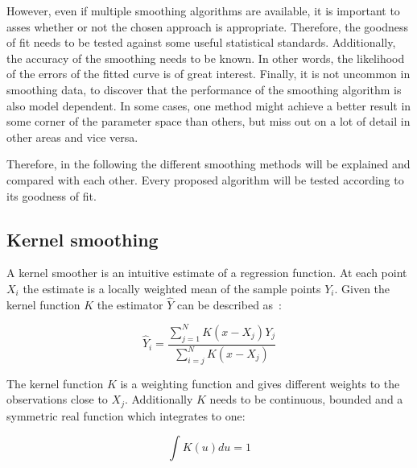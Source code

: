However, even if multiple smoothing algorithms are available, it is important to asses whether or not the chosen approach is appropriate. Therefore, the goodness of fit needs to be tested against some useful statistical standards. Additionally, the accuracy of the smoothing needs to be known. In other words, the likelihood of the errors of the fitted curve is of great interest. Finally, it is not uncommon in smoothing data, to discover that the performance of the smoothing algorithm is also model dependent. In some cases, one method might achieve a better result in some corner of the parameter space than others, but miss out on a lot of detail in other areas and vice versa. 

Therefore, in the following the different smoothing methods will be explained and compared with each other. Every proposed algorithm will be tested according to its goodness of fit.

\subsection{Kernel smoothing}\label{subsec:kernelSmoothing}
A kernel smoother is an intuitive estimate of a regression function. At each point $X_{i}$ the estimate is a locally weighted mean of the sample points $Y_{i}$. Given the kernel function $K$ the estimator $\hat{Y}$ can be described as~\cite{Nadaraya1964,Watson1964}:

\begin{equation}
	\hat{Y}_{i} = \frac{\sum_{j=1}^{N}{K(x-X_{j})Y_{j}}}{\sum_{i=j}^{N}K(x-X_{j})}
\label{eq:nadarayaWatsonKernel}
\end{equation}

The kernel function $K$ is a weighting function and gives different weights to the observations close to $X_{j}$. Additionally $K$ needs to be continuous, bounded and a symmetric real function which integrates to one:

\begin{equation}
	\int{K(u)du}=1
\label{eq:kernelCondition}
\end{equation}


